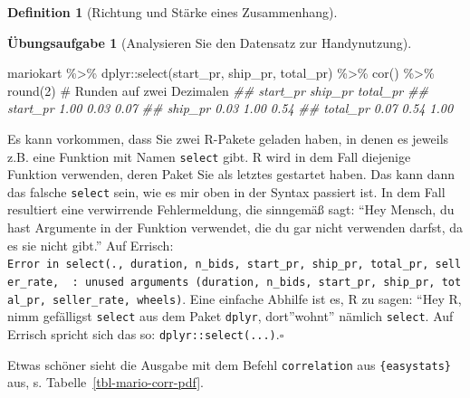 \documentclass[
  a4paper,
  DIV=11]{scrreprt}
\newenvironment{Shaded}{\begin{snugshade}}{\end{snugshade}}
\newcommand{\CommentTok}[1]{\textcolor[rgb]{0.37,0.37,0.37}{#1}}
\newcommand{\DecValTok}[1]{\textcolor[rgb]{0.68,0.00,0.00}{#1}}
\newcommand{\DocumentationTok}[1]{\textcolor[rgb]{0.37,0.37,0.37}{\textit{#1}}}
\newcommand{\FunctionTok}[1]{\textcolor[rgb]{0.28,0.35,0.67}{#1}}
\newcommand{\NormalTok}[1]{\textcolor[rgb]{0.00,0.23,0.31}{#1}}
\newcommand{\SpecialCharTok}[1]{\textcolor[rgb]{0.37,0.37,0.37}{#1}}
\theoremstyle{definition}
\newtheorem{exercise}{Übungsaufgabe}[chapter]
\theoremstyle{definition}
\theoremstyle{definition}
\newtheorem{definition}{Definition}[chapter]
\theoremstyle{remark}
\begin{document}
\begin{definition}[Richtung und Stärke eines
Zusammenhang]
\begin{exercise}[Analysieren Sie den Datensatz zur
Handynutzung]
\begin{Shaded}
\begin{Highlighting}[]
\NormalTok{mariokart }\SpecialCharTok{\%\textgreater{}\%}  
\NormalTok{  dplyr}\SpecialCharTok{::}\FunctionTok{select}\NormalTok{(start\_pr, ship\_pr, total\_pr) }\SpecialCharTok{\%\textgreater{}\%} 
  \FunctionTok{cor}\NormalTok{() }\SpecialCharTok{\%\textgreater{}\%} 
  \FunctionTok{round}\NormalTok{(}\DecValTok{2}\NormalTok{) }\CommentTok{\# Runden auf zwei Dezimalen}
\DocumentationTok{\#\#          start\_pr ship\_pr total\_pr}
\DocumentationTok{\#\# start\_pr     1.00    0.03     0.07}
\DocumentationTok{\#\# ship\_pr      0.03    1.00     0.54}
\DocumentationTok{\#\# total\_pr     0.07    0.54     1.00}
\end{Highlighting}
\end{Shaded}

\begin{tcolorbox}[enhanced jigsaw, leftrule=.75mm, opacitybacktitle=0.6, colback=white, colframe=quarto-callout-caution-color-frame, coltitle=black, colbacktitle=quarto-callout-caution-color!10!white, opacityback=0, left=2mm, breakable, titlerule=0mm, toptitle=1mm, bottomtitle=1mm, rightrule=.15mm, title=\textcolor{quarto-callout-caution-color}{\faFire}\hspace{0.5em}{Namensverwechslung (name clash)}, arc=.35mm, bottomrule=.15mm, toprule=.15mm]

Es kann vorkommen, dass Sie zwei R-Pakete geladen haben, in denen es
jeweils z.B. eine Funktion mit Namen \texttt{select} gibt. R wird in dem
Fall diejenige Funktion verwenden, deren Paket Sie als letztes gestartet
haben. Das kann dann das falsche \texttt{select} sein, wie es mir oben
in der Syntax passiert ist. In dem Fall resultiert eine verwirrende
Fehlermeldung, die sinngemäß sagt: ``Hey Mensch, du hast Argumente in
der Funktion verwendet, die du gar nicht verwenden darfst, da es sie
nicht gibt.'' Auf Errisch:
\texttt{Error\ in\ select(.,\ duration,\ n\_bids,\ start\_pr,\ ship\_pr,\ total\_pr,\ seller\_rate,\ \ :\ unused\ arguments\ (duration,\ n\_bids,\ start\_pr,\ ship\_pr,\ total\_pr,\ seller\_rate,\ wheels)}.
Eine einfache Abhilfe ist es, R zu sagen: ``Hey R, nimm gefälligst
\texttt{select} aus dem Paket \texttt{dplyr}, dort''wohnt'' nämlich
\texttt{select}. Auf Errisch spricht sich das so:
\texttt{dplyr::select(...)}.\(\square\)

\end{tcolorbox}

Etwas schöner sieht die Ausgabe mit dem Befehl \texttt{correlation} aus
\texttt{\{easystats\}} aus, s. Tabelle~\ref{tbl-mario-corr-pdf}.


\end{exercise}
\end{definition}
\end{document}
